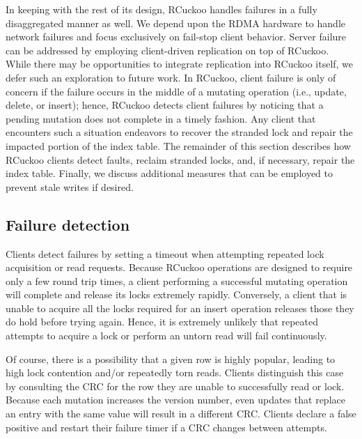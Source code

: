 In keeping with the rest of its design, RCuckoo handles failures in a
fully disaggregated manner as well.  We depend upon the RDMA hardware
to handle network failures and focus exclusively on fail-stop client
behavior.  Server failure can be addressed by employing client-driven
replication on top of RCuckoo.  While there may be opportunities to
integrate replication into RCuckoo itself, we defer such an
exploration to future work.  In RCuckoo, client failure is only of
concern if the failure occurs in the middle of a mutating operation
(i.e., update, delete, or insert); hence, RCuckoo detects client
failures by noticing that a pending mutation does not complete in a
timely fashion.  Any client that encounters such a situation endeavors
to recover the stranded lock and repair the impacted portion of the
index table.
%
%
The remainder of this section describes how RCuckoo clients detect
faults, reclaim stranded locks, and, if necessary, repair the index
table.  Finally, we discuss additional measures that can
be employed to prevent stale writes if desired.


\subsection{Failure detection}
\label{ss:fd}

Clients detect failures by setting a timeout when attempting repeated
lock acquisition or read requests.  Because RCuckoo operations are
designed to require only a few round trip times, a client performing a
successful mutating operation will complete and release its locks
extremely rapidly.  Conversely, a client that is unable to acquire all
the locks required for an insert operation releases those they do hold
before trying again.  Hence, it is extremely unlikely that repeated
attempts to acquire a lock or perform an untorn read will fail
continuously.

Of course, there is a possibility that a given row is highly popular,
leading to high lock contention and/or repeatedly torn reads.
Clients distinguish this case by consulting the CRC for the row they
are unable to successfully read or lock.  Because each mutation
increases the version number, even updates that replace an entry with
the same value will result in a different CRC.  Clients declare a
false positive and restart their failure timer if a CRC changes
between attempts.

